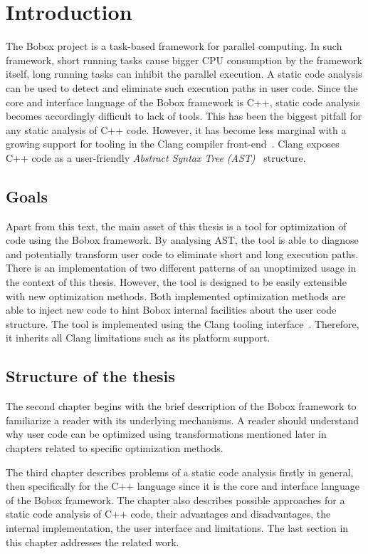 \chapter{Introduction}
The Bobox project is a task-based framework for parallel computing. In such framework, short running tasks cause bigger CPU consumption by the framework itself, long running tasks can inhibit the parallel execution. A static code analysis can be used to detect and eliminate such execution paths in user code. Since the core and interface language of the Bobox framework is C++, static code analysis becomes accordingly difficult to lack of tools. This has been the biggest pitfall for any static analysis of C++ code. However, it has become less marginal with a growing support for tooling in the Clang compiler front-end~\cite{clang}. Clang exposes C++ code as a user-friendly \emph{Abstract Syntax Tree (AST)}~\cite{ast} structure.

\section{Goals}
Apart from this text, the main asset of this thesis is a tool for optimization of code using the Bobox framework. By analysing AST, the tool is able to diagnose and potentially transform user code to eliminate short and long execution paths. There is an implementation of two different patterns of an unoptimized usage in the context of this thesis. However, the tool is designed to be easily extensible with new optimization methods. Both implemented optimization methods are able to inject new code to hint Bobox internal facilities about the user code structure. The tool is implemented using the Clang tooling interface~\cite{clang-documentation}. Therefore, it inherits all Clang limitations such as its platform support.

\section{Structure of the thesis}
The second chapter begins with the brief description of the Bobox framework to familiarize a reader with its underlying mechanisms. A reader should understand why user code can be optimized using transformations mentioned later in chapters related to specific optimization methods.

The third chapter describes problems of a static code analysis firstly in general, then specifically for the C++ language since it is the core and interface language of the Bobox framework. The chapter also describes possible approaches for a static code analysis of C++ code, their advantages and disadvantages, the internal implementation, the user interface and limitations. The last section in this chapter addresses the related work.

